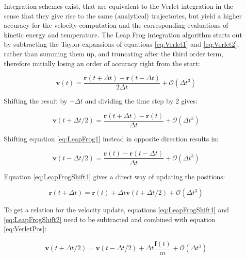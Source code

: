 \documentclass[english, a4paper, 12pt, titlepage, draft]{article}
\newcommand{\vect}[1]{\mathbf{#1}}
\newcommand{\vfun}[2]{\vect{#1}\left(#2\right)}
\begin{document}
Integration schemes exist, that are equivalent to the Verlet integration in the sense that they give rise to the same (analytical) trajectories, but yield a higher accuracy for the velocity computation and the corresponding evaluations of kinetic energy and temperature.
The Leap Frog integration algorithm starts out by subtracting the Taylor expansions of equations \ref{eq:Verlet1} and \ref{eq:Verlet2}, rather than summing them up, and truncating after the third order term, therefore initially losing an order of accuracy right from the start:

\begin{equation}
    \vfun{v}{t} = \frac{\vfun{r}{t+\Delta t} - \vfun{r}{t-\Delta t}}{2 \Delta t} + \mathcal{O}(\Delta t^3)
    \label{eq:LeapFrog1}
\end{equation}

\noindent
Shifting the result by $+\Delta t$ and dividing the time step by $2$ gives:

\begin{equation}
    \vfun{v}{t + \Delta t/2} = \frac{\vfun{r}{t+\Delta t} - \vfun{r}{t}}{\Delta t} + \mathcal{O}(\Delta t^3)
    \label{eq:LeapFrogShift1}
\end{equation}

\noindent
Shifting equation \ref{eq:LeapFrog1} instead in opposite direction results in:

\begin{equation}
    \vfun{v}{t - \Delta t/2} = \frac{\vfun{r}{t} - \vfun{r}{t-\Delta t}}{\Delta t} + \mathcal{O}(\Delta t^3)
    \label{eq:LeapFrogShift2}
\end{equation} 

\noindent
Equation \ref{eq:LeapFrogShift1} gives a direct way of updating the positions:

\begin{equation}
    \vfun{r}{t+\Delta t} = \vfun{r}{t} + \Delta t \vfun{v}{t+\Delta t/2} + \mathcal{O}(\Delta t^3)
\end{equation}

\noindent
To get a relation for the velocity update, equations \ref{eq:LeapFrogShift1} and \ref{eq:LeapFrogShift2} need to be subtracted and combined with equation \ref{eq:VerletPos}:

\begin{equation}
    \vfun{v}{t+\Delta t/2} = \vfun{v}{t-\Delta t/2} + \Delta t \frac{\vfun{f}{t}}{m} + \mathcal{O}(\Delta t^3)
\end{equation}
\end{document}
